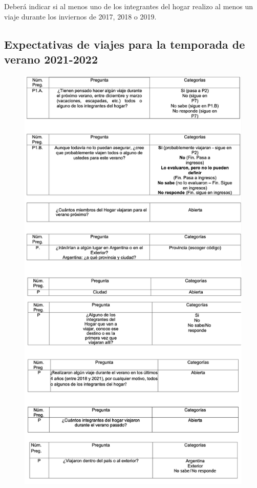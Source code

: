 \documentclass[
  openany]{book}
\begin{document}
Deberá indicar si al menos uno de los integrantes del hogar realizo al menos un viaje durante los inviernos de 2017, 2018 o 2019.

\hypertarget{expectativas-de-viajes-para-la-temporada-de-verano-2021-2022}{%
\subsection{Expectativas de viajes para la temporada de verano 2021-2022}\label{expectativas-de-viajes-para-la-temporada-de-verano-2021-2022}}

\begin{figure}

{\centering \includegraphics[width=1\linewidth]{imagenes/figura6-317} 

}

\end{figure}
\end{document}
